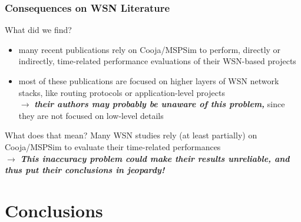 \documentclass[10pt,c]{beamer}
\renewcommand{\emph}[1]{\textbf{\textit{#1}}}
\begin{document}
\begin{frame}
\vspace{-0.25cm}
\frametitle{Consequences on WSN Literature}
\begin{block}{What did we find?}
\begin{itemize}
\item many recent publications rely on Cooja/MSPSim to perform, directly
or indirectly, time-related performance evaluations of their WSN-based
projects
\cite{Constrain-Routing-Trees-2014} \cite{DINAS-2014}
\cite{Efficient-Distrib-Svc-Discovery-2014} \cite{IETF-Routing-WSN-2014}
\cite{TinySDN-2014} \cite{Trickle-L2-2014}
\cite{Visual-Sensor-Networks-2014} \cite{Key-Mgmt-2015}
\item most of these publications are focused on higher layers of WSN
network stacks, like routing protocols 
\cite{Constrain-Routing-Trees-2014}
\cite{IETF-Routing-WSN-2014} \cite{Trickle-L2-2014}
or application-level projects
\cite{DINAS-2014} \cite{Efficient-Distrib-Svc-Discovery-2014}
\cite{Visual-Sensor-Networks-2014} \cite{Key-Mgmt-2015} \\
$\rightarrow$ \emph{their authors may probably be unaware of this problem,}
since they are not focused on low-level details
\end{itemize}
\end{block}
\vspace{-0.25cm}
\begin{alertblock}{What does that mean?}
Many WSN studies rely (at least partially) on Cooja/MSPSim to evaluate
their time-related performances \\
$\rightarrow$ \emph{This inaccuracy problem could make their results
unreliable, and thus put their conclusions in jeopardy!}
\end{alertblock}
\end{frame}


\section{Conclusions}
\end{document}

